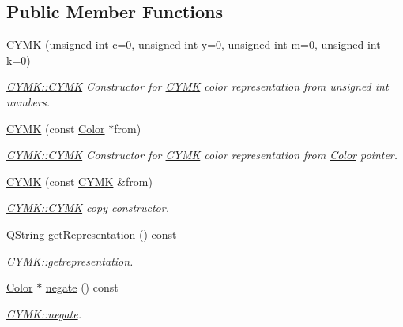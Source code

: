 \subsection*{Public Member Functions}
\begin{DoxyCompactItemize}
\item 
\hyperlink{class_c_y_m_k_a1aa6a0953837818a2b298476cab9388d}{C\+Y\+MK} (unsigned int c=0, unsigned int y=0, unsigned int m=0, unsigned int k=0)
\begin{DoxyCompactList}\small\item\em \hyperlink{class_c_y_m_k_a1aa6a0953837818a2b298476cab9388d}{C\+Y\+M\+K\+::\+C\+Y\+MK} Constructor for \hyperlink{class_c_y_m_k}{C\+Y\+MK} color representation from unsigned int numbers. \end{DoxyCompactList}\item 
\hyperlink{class_c_y_m_k_ab524ef2e847938b2efff28886387ec51}{C\+Y\+MK} (const \hyperlink{class_color}{Color} $\ast$from)
\begin{DoxyCompactList}\small\item\em \hyperlink{class_c_y_m_k_a1aa6a0953837818a2b298476cab9388d}{C\+Y\+M\+K\+::\+C\+Y\+MK} Constructor for \hyperlink{class_c_y_m_k}{C\+Y\+MK} color representation from \hyperlink{class_color}{Color} pointer. \end{DoxyCompactList}\item 
\hyperlink{class_c_y_m_k_a4bccfb3b46229aa82827bd6988efaa8c}{C\+Y\+MK} (const \hyperlink{class_c_y_m_k}{C\+Y\+MK} \&from)
\begin{DoxyCompactList}\small\item\em \hyperlink{class_c_y_m_k_a1aa6a0953837818a2b298476cab9388d}{C\+Y\+M\+K\+::\+C\+Y\+MK} copy constructor. \end{DoxyCompactList}\item 
Q\+String \hyperlink{class_c_y_m_k_aa523f734fd52f67ca9fcb31f0b7fe579}{get\+Representation} () const
\begin{DoxyCompactList}\small\item\em C\+Y\+M\+K\+::getrepresentation. \end{DoxyCompactList}\item 
\hyperlink{class_color}{Color} $\ast$ \hyperlink{class_c_y_m_k_a397c0109e76ff6cc331b49e4b73623ef}{negate} () const
\begin{DoxyCompactList}\small\item\em \hyperlink{class_c_y_m_k_a397c0109e76ff6cc331b49e4b73623ef}{C\+Y\+M\+K\+::negate}. \end{DoxyCompactList}\item 

\end{DoxyCompactItemize}
